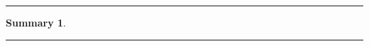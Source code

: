 \documentclass[leqno]{article}			%
\begin{document}

\begin{titlepage}
	\vspace*{1cm}
	\Large
    \textit{\Institute}
    \vspace{0.25cm}

	\Huge
    \textbf{\Title}
    \vspace{0.25cm}

	\Large
	\Author
	\vspace{1.0cm}

	\normalsize
	\rule{\textwidth}{0.4pt}
	\newtheorem*{summary}{Summary}
	\begin{summary}
		\Docsummary
	\end{summary}
	\setcounter{tocdepth}{1}
	\tableofcontents
	\vfill
	\rule{\textwidth}{0.4pt}
\end{titlepage}



\end{document}
